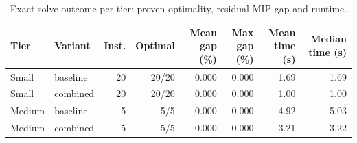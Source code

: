 \begin{table}[htbp]
\centering\small
\caption{Exact-solve outcome per tier: proven optimality, residual MIP gap and runtime.}
\label{tab:strength_bounds_summary}
\begin{tabular}{llrrrrrr}
\toprule
Tier & Variant & Inst. & Optimal & Mean gap (\%) & Max gap (\%) & Mean time (s) & Median time (s) \\
\midrule
Small & baseline & 20 & 20/20 & 0.000 & 0.000 & 1.69 & 1.69 \\
Small & combined & 20 & 20/20 & 0.000 & 0.000 & 1.00 & 1.00 \\
Medium & baseline & 5 & 5/5 & 0.000 & 0.000 & 4.92 & 5.03 \\
Medium & combined & 5 & 5/5 & 0.000 & 0.000 & 3.21 & 3.22 \\
\bottomrule
\end{tabular}
\end{table}
